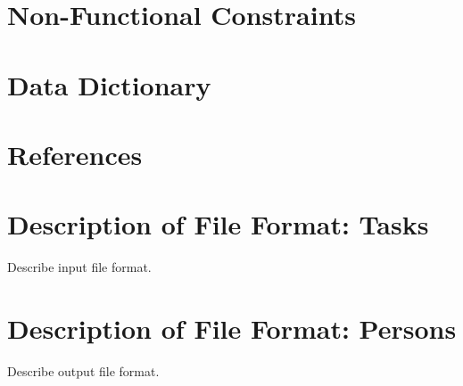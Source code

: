 \documentclass[12pt]{article}
\begin{document}
\section{Non-Functional Constraints}

\section{Data Dictionary}

\section{References}

\appendix

\section{Description of File Format: Tasks}

Describe input file format.

\section{Description of File Format: Persons}

Describe output file format.
\end{document}
